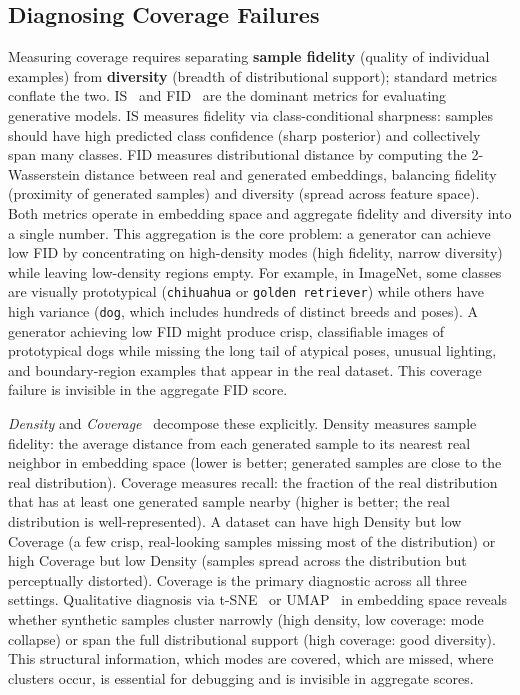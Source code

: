 \subsection{Diagnosing Coverage Failures} \label{sec:25-background-distribution-diagnosis}
\begin{foldable}
  Measuring coverage requires separating \textbf{sample fidelity} (quality of individual examples) from \textbf{diversity} (breadth of distributional support); standard metrics conflate the two.
  \Ac{IS}~\cite{salimans2016improved} and \ac{FID}~\cite{heusel2017gans} are the dominant metrics for evaluating generative models.
  \ac{IS} measures fidelity via class-conditional sharpness: samples should have high predicted class confidence (sharp posterior) and collectively span many classes.
  \ac{FID} measures distributional distance by computing the 2-Wasserstein distance between real and generated embeddings, balancing fidelity (proximity of generated samples) and diversity (spread across feature space).
  Both metrics operate in embedding space and aggregate fidelity and diversity into a single number.
  This aggregation is the core problem: a generator can achieve low \ac{FID} by concentrating on high-density modes (high fidelity, narrow diversity) while leaving low-density regions empty.
  For example, in ImageNet, some classes are visually prototypical (\texttt{chihuahua} or \texttt{golden retriever}) while others have high variance (\texttt{dog}, which includes hundreds of distinct breeds and poses).
  A generator achieving low \ac{FID} might produce crisp, classifiable images of prototypical dogs while missing the long tail of atypical poses, unusual lighting, and boundary-region examples that appear in the real dataset.
  This coverage failure is invisible in the aggregate \ac{FID} score.
\end{foldable}

\begin{foldable}
  \textit{Density} and \textit{Coverage}~\cite{naeem2020reliable} decompose these explicitly.
  Density measures sample fidelity: the average distance from each generated sample to its nearest real neighbor in embedding space (lower is better; generated samples are close to the real distribution).
  Coverage measures recall: the fraction of the real distribution that has at least one generated sample nearby (higher is better; the real distribution is well-represented).
  A dataset can have high Density but low Coverage (a few crisp, real-looking samples missing most of the distribution) or high Coverage but low Density (samples spread across the distribution but perceptually distorted).
  Coverage is the primary diagnostic across all three settings.
  Qualitative diagnosis via t-SNE~\cite{van2008visualizing} or UMAP~\cite{mcinnes2018umap} in embedding space reveals whether synthetic samples cluster narrowly (high density, low coverage: mode collapse) or span the full distributional support (high coverage: good diversity).
  This structural information, which modes are covered, which are missed, where clusters occur, is essential for debugging and is invisible in aggregate scores.
\end{foldable}

